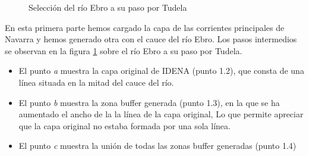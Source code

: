 \begin{figure}[H]
    \centering
    \caption{Selección del río Ebro a su paso por Tudela} \label{fig:ebro-tudela} 
\end{figure} 
En esta primera parte hemos cargado la capa de las corrientes principales de Navarra y hemos generado otra con el cauce del río Ebro.
Los pasos intermedios se observan en la figura \ref{fig:ebro-tudela} sobre el río Ebro a su paso por Tudela.
\begin{itemize}
    \item El punto \textit{a} muestra la capa original de IDENA (punto 1.2), que consta de una línea situada en la mitad del cauce del río.
    \item El punto \textit{b} muestra la zona buffer generada  (punto 1.3), en la que se ha aumentado el ancho de la la línea de la capa original,
    Lo que permite apreciar que la capa original no estaba formada por una sola línea. 
    \item El punto \textit{c} muestra la unión de todas las zonas buffer generadas (punto 1.4)
\end{itemize}

